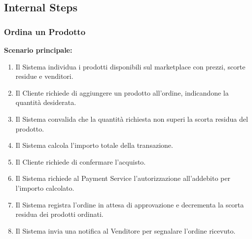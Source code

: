 \subsection{Internal Steps}
\label{subsec:uc_internal_steps}

\subsubsection{Ordina un Prodotto}
\label{u:uc04}

\textbf{Scenario principale:}
\begin{enumerate}
    \item Il Sistema individua i prodotti disponibili sul marketplace con prezzi, scorte residue e venditori.
    \item Il Cliente richiede di aggiungere un prodotto all'ordine, indicandone la quantità desiderata.
    \item Il Sistema convalida che la quantità richiesta non superi la scorta residua del prodotto.
    \item Il Sistema calcola l'importo totale della transazione. \label{step:calcolo_totale}
    \item Il Cliente richiede di confermare l'acquisto. \label{step:conferma_acquisto}
    \item Il Sistema richiede al Payment Service l'autorizzazione all'addebito per l'importo calcolato.
    \item Il Sistema registra l'ordine in attesa di approvazione e decrementa la scorta residua dei prodotti ordinati.
    \item Il Sistema invia una notifica al Venditore per segnalare l'ordine ricevuto.
\end{enumerate}

